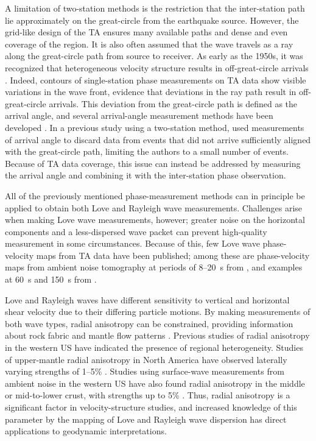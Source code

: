 \documentclass[12pt,oneside]{book}
\begin{document}
A limitation of two-station methods is the restriction that the inter-station path lie approximately on the great-circle from the earthquake source. However, the grid-like design of the TA ensures many available paths and dense and even coverage of the region. It is also often assumed that the wave travels as a ray along the great-circle path from source to receiver. As early as the 1950s, it was recognized that heterogeneous velocity structure results in off-great-circle arrivals \citep{Evernden1954}. Indeed, contours of single-station phase measurements on TA data show visible variations in the wave front, evidence that deviations in the ray path result in off-great-circle arrivals. This deviation from the great-circle path is defined as the arrival angle, and several arrival-angle measurement methods have been developed \citep[e.g.,][]{Vidale1986,Lerner-Lam1989,Laske1994,Larson2002}.  In a previous study using a two-station method, \citet{Brisbourne1998} used measurements of arrival angle to discard data from events that did not arrive sufficiently aligned with the great-circle path, limiting the authors to a small number of events. Because of TA data coverage, this issue can instead be addressed by measuring the arrival angle and combining it with the inter-station phase observation.

All of the previously mentioned phase-measurement methods can in principle be applied to obtain both Love and Rayleigh wave measurements. Challenges arise when making Love wave measurements, however; greater noise on the horizontal components and a less-dispersed wave packet can prevent high-quality measurement in some circumstances. Because of this, few Love wave phase-velocity maps from TA data have been published; among these are phase-velocity maps from ambient noise tomography at periods of 8\nobreakdash--20~s from \citet{Linetal2008}, and examples at 60~s and 150~s from \citet{Yoshizawa2010}.

Love and Rayleigh waves have different sensitivity to vertical and horizontal shear velocity due to their differing particle motions. By making measurements of both wave types, radial anisotropy can be constrained, providing information about rock fabric and mantle flow patterns \citep[e.g.,][]{Becker2003}. Previous studies of radial anisotropy in the western US have indicated the presence of regional heterogeneity. Studies of upper-mantle radial anisotropy in North America have observed laterally varying strengths of 1\nobreakdash--5\% \citep{Nettles&Dziewonski2008,Yuanetal2011}. Studies using surface-wave measurements from ambient noise in the western US have also found radial anisotropy in the middle or mid-to-lower crust, with strengths up to 5\% \citep{Bensen2009,Moschetti2010}. Thus, radial anisotropy is a significant factor in velocity-structure studies, and increased knowledge of this parameter by the mapping of Love and Rayleigh wave dispersion has direct applications to geodynamic interpretations.
\end{document}
